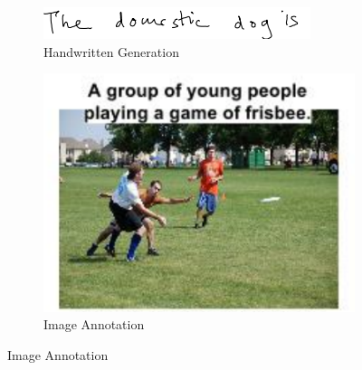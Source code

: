\documentclass{beamer}
\begin{document}
\begin{frame}
\begin{figure}
				\begin{subfigure}{.49\textwidth}
					\vspace{1.5cm}
					\centering  \includegraphics[scale=0.7]{img/hand_write} 
					\caption{Handwritten Generation }
				\end{subfigure}
				\begin{subfigure}{.49\textwidth}
					\centering \includegraphics[scale=0.2]{img/image_ann} 
					\caption{Image Annotation}
				\end{subfigure}
			\end{figure}
			
			
	\end{frame}
	
\end{document}
